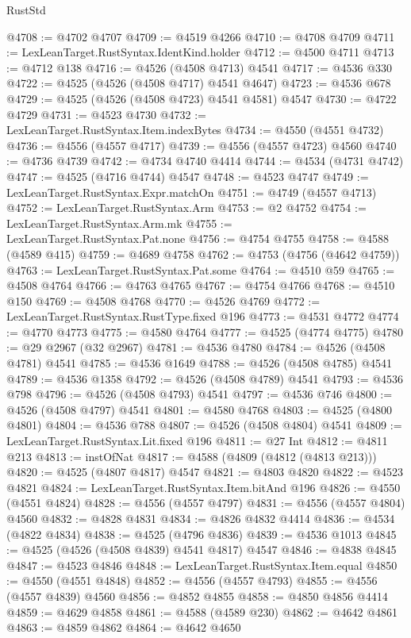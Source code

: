 \begin{lexlean}{RustStd}
\begin{coremodule}
{\begin{coremodule}
{{{{{{{{{{{{{{{{{{{{{{{{{{{{{{{{{{{{{{{{{{{{{{{{{{{{{{{@4708 := @4702 @4707
@4709 := @4519 @4266
@4710 := @4708 @4709
@4711 := LexLeanTarget.RustSyntax.IdentKind.holder
@4712 := @4500 @4711
@4713 := @4712 @138
@4716 := @4526 (@4508 @4713) @4541
@4717 := @4536 @330
@4722 := @4525 (@4526 (@4508 @4717) @4541 @4647)
@4723 := @4536 @678
@4729 := @4525 (@4526 (@4508 @4723) @4541 @4581) @4547
@4730 := @4722 @4729
@4731 := @4523 @4730
@4732 := LexLeanTarget.RustSyntax.Item.indexBytes
@4734 := @4550 (@4551 @4732)
@4736 := @4556 (@4557 @4717)
@4739 := @4556 (@4557 @4723) @4560
@4740 := @4736 @4739
@4742 := @4734 @4740 @4414
@4744 := @4534 (@4731 @4742)
@4747 := @4525 (@4716 @4744) @4547
@4748 := @4523 @4747
@4749 := LexLeanTarget.RustSyntax.Expr.matchOn
@4751 := @4749 (@4557 @4713)
@4752 := LexLeanTarget.RustSyntax.Arm
@4753 := @2 @4752
@4754 := LexLeanTarget.RustSyntax.Arm.mk
@4755 := LexLeanTarget.RustSyntax.Pat.none
@4756 := @4754 @4755
@4758 := @4588 (@4589 @415)
@4759 := @4689 @4758
@4762 := @4753 (@4756 (@4642 @4759))
@4763 := LexLeanTarget.RustSyntax.Pat.some
@4764 := @4510 @59
@4765 := @4508 @4764
@4766 := @4763 @4765
@4767 := @4754 @4766
@4768 := @4510 @150
@4769 := @4508 @4768
@4770 := @4526 @4769
@4772 := LexLeanTarget.RustSyntax.RustType.fixed @196
@4773 := @4531 @4772
@4774 := @4770 @4773
@4775 := @4580 @4764
@4777 := @4525 (@4774 @4775)
@4780 := @29 @2967 (@32 @2967)
@4781 := @4536 @4780
@4784 := @4526 (@4508 @4781) @4541
@4785 := @4536 @1649
@4788 := @4526 (@4508 @4785) @4541
@4789 := @4536 @1358
@4792 := @4526 (@4508 @4789) @4541
@4793 := @4536 @798
@4796 := @4526 (@4508 @4793) @4541
@4797 := @4536 @746
@4800 := @4526 (@4508 @4797) @4541
@4801 := @4580 @4768
@4803 := @4525 (@4800 @4801)
@4804 := @4536 @788
@4807 := @4526 (@4508 @4804) @4541
@4809 := LexLeanTarget.RustSyntax.Lit.fixed @196
@4811 := @27 Int
@4812 := @4811 @213
@4813 := instOfNat
@4817 := @4588 (@4809 (@4812 (@4813 @213)))
@4820 := @4525 (@4807 @4817) @4547
@4821 := @4803 @4820
@4822 := @4523 @4821
@4824 := LexLeanTarget.RustSyntax.Item.bitAnd @196
@4826 := @4550 (@4551 @4824)
@4828 := @4556 (@4557 @4797)
@4831 := @4556 (@4557 @4804) @4560
@4832 := @4828 @4831
@4834 := @4826 @4832 @4414
@4836 := @4534 (@4822 @4834)
@4838 := @4525 (@4796 @4836)
@4839 := @4536 @1013
@4845 := @4525 (@4526 (@4508 @4839) @4541 @4817) @4547
@4846 := @4838 @4845
@4847 := @4523 @4846
@4848 := LexLeanTarget.RustSyntax.Item.equal
@4850 := @4550 (@4551 @4848)
@4852 := @4556 (@4557 @4793)
@4855 := @4556 (@4557 @4839) @4560
@4856 := @4852 @4855
@4858 := @4850 @4856 @4414
@4859 := @4629 @4858
@4861 := @4588 (@4589 @230)
@4862 := @4642 @4861
@4863 := @4859 @4862
@4864 := @4642 @4650
}}}}}}}}}}}}}}}}}}}}}}}}}}}}}}}}}}}}}}}}}}}}}}}}}}}}}}}
\end{coremodule}}
\end{coremodule}
\end{lexlean}
